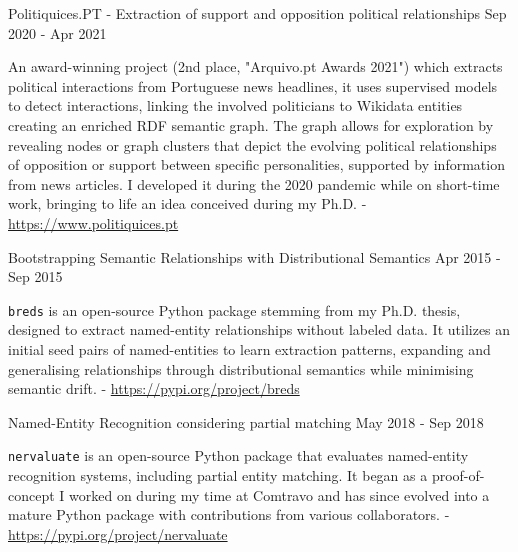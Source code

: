 

\begin{cventries}
  \cvproject
    {} %
	{Politiquices.PT - Extraction of support and opposition political relationships} %
    {} %
    {Sep 2020 - Apr 2021} %
    {
      \begin{cvitems} %
		  \item{An award-winning project (2nd place, "Arquivo.pt Awards 2021") which extracts political interactions from Portuguese news headlines, it uses supervised models to detect interactions, linking the involved politicians to Wikidata entities creating an enriched RDF semantic graph. The graph allows for exploration by revealing nodes or graph clusters that depict the evolving political relationships of opposition or support between specific personalities, supported by information from news articles. I developed it during the 2020 pandemic while on short-time work, bringing to life an idea conceived during my Ph.D. - \url{https://www.politiquices.pt}}
      \end{cvitems}
    }
\end{cventries}




\begin{cventries}
 \cvproject
   {} %
   {Bootstrapping Semantic Relationships with Distributional Semantics} %
   {} %
   {Apr 2015 - Sep 2015} %
   {
     \begin{cvitems} %
		\item {\texttt{breds} is an open-source Python package stemming from my Ph.D. thesis, designed to extract named-entity relationships without labeled data. It utilizes an initial seed pairs of named-entities to learn extraction patterns, expanding and generalising relationships through distributional semantics while minimising semantic drift. - \url{https://pypi.org/project/breds}}
     \end{cvitems}
   }
\end{cventries}

\begin{cventries}
 \cvproject
   {} %
   {Named-Entity Recognition considering partial matching} %
   {} %
   {May 2018 - Sep 2018} %
   {
     \begin{cvitems} %
     	\item {\texttt{nervaluate} is an open-source Python package that evaluates named-entity recognition systems, including partial entity matching. It began as a proof-of-concept I worked on during my time at Comtravo and has since evolved into a mature Python package with contributions from various collaborators. - \url{https://pypi.org/project/nervaluate}}
     \end{cvitems}
   }
\end{cventries}
